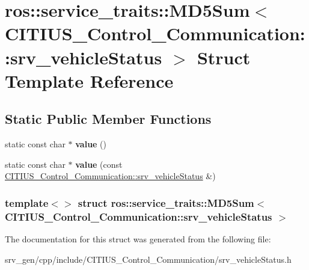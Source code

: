 \hypertarget{structros_1_1service__traits_1_1_m_d5_sum_3_01_c_i_t_i_u_s___control___communication_1_1srv__vehicle_status_01_4}{\section{ros\-:\-:service\-\_\-traits\-:\-:\-M\-D5\-Sum$<$ \-C\-I\-T\-I\-U\-S\-\_\-\-Control\-\_\-\-Communication\-:\-:srv\-\_\-vehicle\-Status $>$ \-Struct \-Template \-Reference}
\label{structros_1_1service__traits_1_1_m_d5_sum_3_01_c_i_t_i_u_s___control___communication_1_1srv__vehicle_status_01_4}
}
\subsection*{\-Static \-Public \-Member \-Functions}
\begin{DoxyCompactItemize}
\item 
\hypertarget{structros_1_1service__traits_1_1_m_d5_sum_3_01_c_i_t_i_u_s___control___communication_1_1srv__vehicle_status_01_4_a1e96f56693f2394d0ffc99ef81b2e4e1}{static const char $\ast$ {\bfseries value} ()}\label{structros_1_1service__traits_1_1_m_d5_sum_3_01_c_i_t_i_u_s___control___communication_1_1srv__vehicle_status_01_4_a1e96f56693f2394d0ffc99ef81b2e4e1}

\item 
\hypertarget{structros_1_1service__traits_1_1_m_d5_sum_3_01_c_i_t_i_u_s___control___communication_1_1srv__vehicle_status_01_4_aaca1d175d0f95782539b22a7b38f8978}{static const char $\ast$ {\bfseries value} (const \hyperlink{struct_c_i_t_i_u_s___control___communication_1_1srv__vehicle_status}{\-C\-I\-T\-I\-U\-S\-\_\-\-Control\-\_\-\-Communication\-::srv\-\_\-vehicle\-Status} \&)}\label{structros_1_1service__traits_1_1_m_d5_sum_3_01_c_i_t_i_u_s___control___communication_1_1srv__vehicle_status_01_4_aaca1d175d0f95782539b22a7b38f8978}

\end{DoxyCompactItemize}
\subsubsection*{template$<$$>$ struct ros\-::service\-\_\-traits\-::\-M\-D5\-Sum$<$ C\-I\-T\-I\-U\-S\-\_\-\-Control\-\_\-\-Communication\-::srv\-\_\-vehicle\-Status $>$}



\-The documentation for this struct was generated from the following file\-:\begin{DoxyCompactItemize}
\item 
srv\-\_\-gen/cpp/include/\-C\-I\-T\-I\-U\-S\-\_\-\-Control\-\_\-\-Communication/srv\-\_\-vehicle\-Status.\-h\end{DoxyCompactItemize}
